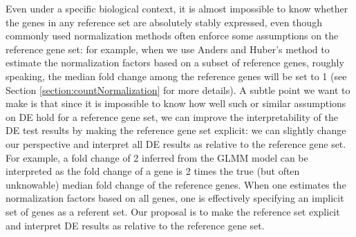 \documentclass[letterpaper,12pt]{article}
\begin{document}

Even under a specific biological context,  it is almost impossible to know
whether the genes in any reference set are absolutely stably expressed, even
though commonly used normalization methods often enforce some assumptions on
the reference gene set: for example, when we use Anders and Huber's
method to estimate the normalization factors based on a subset of reference
genes, roughly speaking, the median fold change among the reference genes will
be set to 1 (see Section \ref{section:countNormalization} for more details). A
subtle point we want to make is that since it is impossible to know how well
such or similar assumptions on DE hold for a reference gene set,
we can improve the interpretability of the DE test results by making the
reference gene set explicit:  we can slightly change our perspective and
interpret all DE results as relative to the reference gene set.  
For example, a fold change of 2 inferred from the GLMM model can be
interpreted as the fold change of a gene is 2 times the true (but often
unknowable) median fold change of the reference genes.  
When one estimates the normalization factors based on all genes, one is
effectively specifying an implicit set of genes as a referent set.  Our
proposal is to make the reference set explicit and interpret DE results as
relative to the reference gene set.
\end{document}

